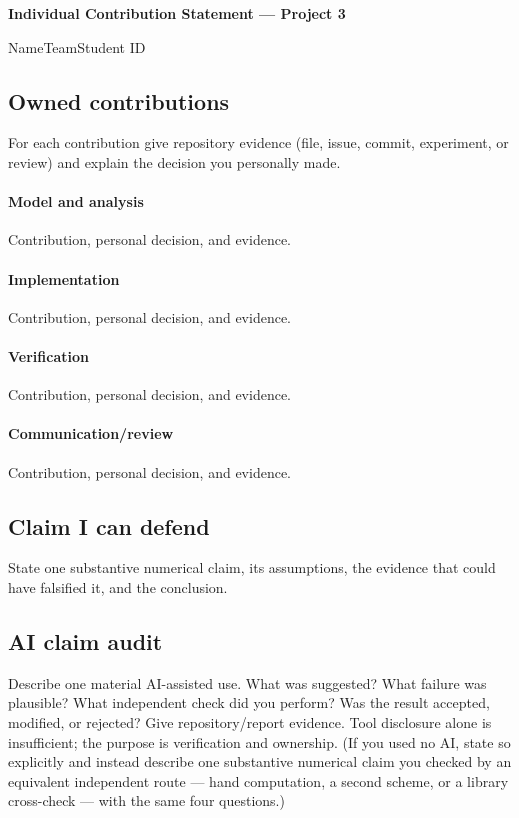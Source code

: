 {}
\begin{center}
{\Large\bfseries Individual Contribution Statement --- Project 3}\par\medskip
\end{center}
Name\enspace \textbf{\membername}\qquad Team\qquad Student ID\enspace \memberid

\subsection*{Owned contributions}
For each contribution give repository evidence (file, issue, commit, experiment, or review) and explain the decision you personally made.

\paragraph{Model and analysis} Contribution, personal decision, and evidence.
\vspace{15mm}
\paragraph{Implementation} Contribution, personal decision, and evidence.
\vspace{15mm}
\paragraph{Verification} Contribution, personal decision, and evidence.
\vspace{15mm}
\paragraph{Communication/review} Contribution, personal decision, and evidence.
\vspace{15mm}
\subsection*{Claim I can defend}
State one substantive numerical claim, its assumptions, the evidence that could have falsified it, and the conclusion.
\vspace{26mm}

\clearpage
{}
\subsection*{AI claim audit}
Describe one material AI-assisted use. What was suggested? What failure was plausible? What independent check did you perform? Was the result accepted, modified, or rejected? Give repository/report evidence. Tool disclosure alone is insufficient; the purpose is verification and ownership. (If you used no AI, state so explicitly and instead describe one substantive numerical claim you checked by an equivalent independent route --- hand computation, a second scheme, or a library cross-check --- with the same four questions.)
\vspace{55mm}

